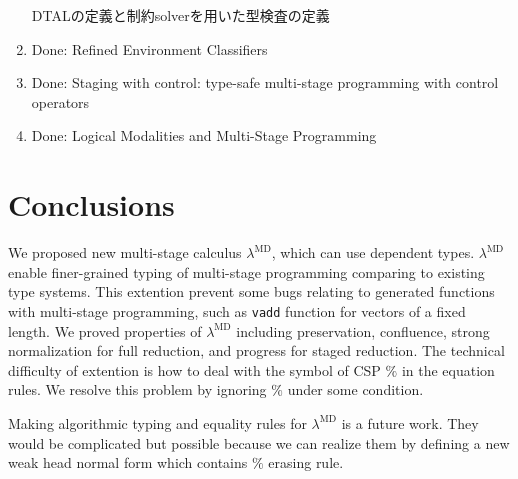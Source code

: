 \documentclass[runningheads]{llncs}
\newcommand{\red}[1]{\textcolor{red}{#1 }}
\newcommand{\LMD}{$\lambda^{\textrm{MD}}$\xspace}
\begin{document}
\begin{enumerate}
	      DTALの定義と制約solverを用いた型検査の定義
	\item Done: Refined Environment Classifiers\cite{kiselyov2016refined}
	\item Done: Staging with control: type-safe multi-stage programming with control operators\cite{oishi2017staging}
	\item Done: Logical Modalities and Multi-Stage Programming\cite{benaissa1999logical}
\end{enumerate}

\section{Conclusions}

We proposed new multi-stage calculus \LMD, which can use dependent types.
\LMD enable finer-grained typing of multi-stage programming comparing to existing type systems.
This extention prevent some bugs relating to generated functions with multi-stage programming,
such as \verb|vadd| function for vectors of a fixed length.
We proved properties of \LMD including preservation, confluence, 
strong normalization for full reduction, and progress for staged reduction.
The technical difficulty of extention is how to deal with the symbol of CSP $\%$ in the equation rules.
We resolve this problem by ignoring $\%$ under some condition.

Making algorithmic typing and equality rules for \LMD is a future work.
They would be complicated but possible 
because we can realize them by defining a new weak head normal form which contains $\%$ erasing rule.
\end{document}
